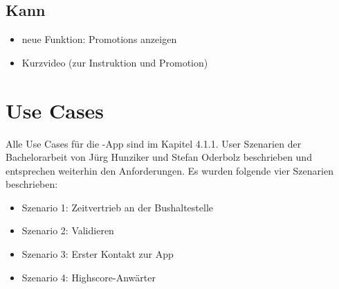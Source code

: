 \subsection{Kann}
\begin{itemize}
	\item neue Funktion: Promotions anzeigen
	\item Kurzvideo (zur Instruktion und Promotion)
\end{itemize}


\section{Use Cases}
Alle Use Cases für die \kort{}-App sind im Kapitel 4.1.1. User Szenarien der Bachelorarbeit von Jürg Hunziker und Stefan Oderbolz beschrieben und entsprechen weiterhin den Anforderungen.\cite{ba-kort-2012} 
Es wurden folgende vier Szenarien beschrieben: 

\begin{itemize}
	\item Szenario 1: Zeitvertrieb an der Bushaltestelle
	\item Szenario 2: Validieren
	\item Szenario 3: Erster Kontakt zur App
	\item Szenario 4: Highscore-Anwärter
\end{itemize}
